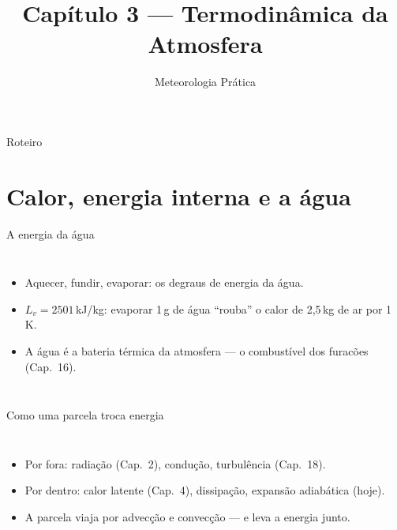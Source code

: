 \documentclass[aspectratio=169,11pt]{beamer}
\title[Cap. 3 --- Termodinâmica]{Capítulo 3 --- Termodinâmica da Atmosfera}
\subtitle{Meteorologia Prática}
\author{}
\date{}
\begin{document}
\begin{frame}
  \titlepage
  \vfill
  \atribuicao
\end{frame}

\begin{frame}{Roteiro}
  \tableofcontents
\end{frame}

\section{Calor, energia interna e a água}

\begin{frame}{A energia da água}
  \begin{columns}
    \begin{itemize}
      \item Aquecer, fundir, evaporar: os degraus de energia da água.
      \item $L_v = 2501$\,kJ/kg: evaporar 1\,g de água ``rouba'' o calor
            de 2{,}5\,kg de ar por 1\,K.
      \item A água é a \alert{bateria térmica} da atmosfera — o
            combustível dos furacões (Cap.~16).
    \end{itemize}
  \end{columns}
\end{frame}

\begin{frame}{Como uma parcela troca energia}
  \begin{columns}
    \begin{itemize}
      \item Por fora: radiação (Cap.~2), condução, turbulência
            (Cap.~18).
      \item Por dentro: calor latente (Cap.~4), dissipação, expansão
            adiabática (hoje).
      \item A parcela viaja por advecção e convecção — e leva a energia
            junto.
    \end{itemize}
  \end{columns}
\end{frame}
\end{document}
